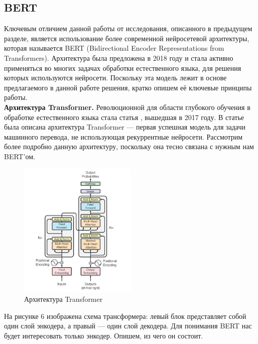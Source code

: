 \documentclass[12pt,a4paper]{article}
\begin{document}
\subsection{BERT}

Ключевым отличием данной работы от исследования, описанного в предыдущем разделе, является использование более современной нейросетевой архитектуры, которая называется BERT (Bidirectional Encoder Representations from Transformers). Архитектура была предложена\cite{bert} в 2018 году и стала активно применяться во многих задачах обработки естественного языка, для решения которых используются нейросети. Поскольку эта модель лежит в основе предлагаемого в данной работе решения, кратко опишем её ключевые принципы работы.\\

\textbf{Архитектура Transformer.} Революционной для области глубокого обучения в обработке естественного языка стала статья \cite{transformer}, вышедшая в 2017 году. В статье была описана архитектура Transformer --- первая успешная модель для задачи машинного перевода, не использующая рекуррентные нейросети. Рассмотрим более подробно данную архитектуру, поскольку  она тесно связана с нужным нам BERT'ом.

\begin{figure}[H]
\begin{center}
  \includegraphics[width=0.5\textwidth]{transformer.jpg}
  \caption{Архитектура Transformer}
\end{center}
\end{figure}

\noindent На рисунке 6 изображена схема трансформера: левый блок представляет собой один слой энкодера, а правый --- один слой декодера. Для понимания BERT нас будет интересовать только энкодер. Опишем, из чего он состоит.
\end{document}
